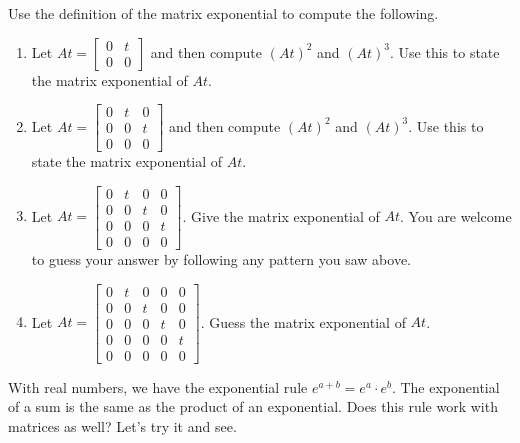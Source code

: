 \begin{problem}
 Use the definition of the matrix exponential to compute the following.
\begin{enumerate}
 \item Let $At=\begin{bmatrix}0&t\\0&0\end{bmatrix}$ and then compute $(At)^2$ and $(At)^3$.  Use this to state the matrix exponential of $At$. 
 \item Let $At=\begin{bmatrix}0&t&0\\0&0&t\\0&0&0\end{bmatrix}$ and then compute $(At)^2$ and $(At)^3$.  Use this to state the matrix exponential of $At$. 
 \item Let $At=\begin{bmatrix}0&t&0&0\\0&0&t&0\\0&0&0&t\\0&0&0&0\end{bmatrix}$. Give the matrix exponential of $At$. You are welcome to guess your answer by following any pattern you saw above. 
 \item Let $At=\begin{bmatrix}0&t&0&0&0\\0&0&t&0&0\\0&0&0&t&0\\0&0&0&0&t\\0&0&0&0&0\end{bmatrix}$. Guess the matrix exponential of $At$. 
\end{enumerate}
\end{problem}

With real numbers, we have the exponential rule $e^{a+b}=e^a\cdot e^b$.  The exponential of a sum is the same as the product of an exponential. Does this rule work with matrices as well?  Let's try it and see.


